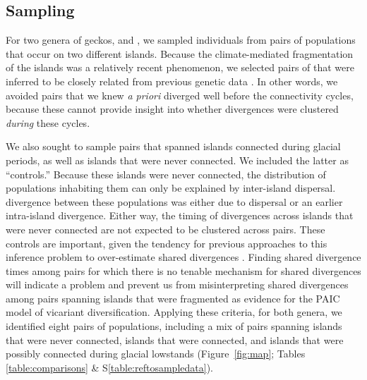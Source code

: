 \subsection{Sampling}
For two genera of geckos,  and , we sampled
individuals from pairs of populations that occur on two different islands.
Because the climate-mediated fragmentation of the islands was a relatively
recent phenomenon, we selected  pairs of
 that were inferred to be closely related
from previous genetic data
\citep{Siler2012, Siler2014kikuchii, Welton2010, Welton2010zootaxa, Siler2010}.
In other words, we avoided pairs that we knew \emph{a priori} diverged well
before the connectivity cycles, because these cannot provide insight into
whether divergences were clustered \emph{during} these cycles.


We also sought to sample pairs that spanned islands connected during glacial
periods, as well as islands that were never connected.
We included the latter as ``controls.''
Because these islands were never connected, the distribution of  populations
inhabiting them can only be explained by inter-island dispersal.
 divergence between these populations was either due to 
dispersal\jroedit{,}{} or an earlier intra-island divergence.
Either way, the timing of divergences across islands that were never connected
are not expected to be clustered across pairs.
These controls are important, given the tendency for previous approaches to this
inference problem to over-estimate shared divergences
\citep{Oaks2012,Oaks2014reply}.
Finding shared  divergence times among pairs for which there is no
tenable mechanism for shared divergences will indicate a problem and prevent us
from misinterpreting shared divergences among pairs spanning islands that were
fragmented as evidence for the PAIC model of vicariant diversification.
Applying these criteria, for both genera, we identified eight pairs of
populations, including a mix of pairs spanning islands that were never
connected, islands that were connected, and islands that were possibly
connected during glacial lowstands
(Figure~\ref{fig:map};
Tables \ref{table:comparisons} \& S\ref{table:reftosampledata}).

